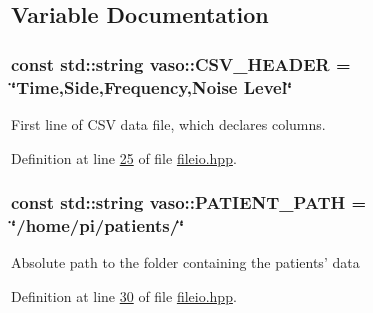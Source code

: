 \subsection{Variable Documentation}
\hypertarget{namespacevaso_ade7cbcaad3dc577b643b3eea4b4e8aa0}{
\subsubsection[{C\+S\+V\+\_\+\+H\+E\+A\+D\+E\+R}]{\setlength{\rightskip}{0pt plus 5cm}const std\+::string vaso\+::\+C\+S\+V\+\_\+\+H\+E\+A\+D\+E\+R = \char`\"{}Time,{\bf Side},Frequency,Noise Level\char`\"{}}}\label{namespacevaso_ade7cbcaad3dc577b643b3eea4b4e8aa0}
First line of C\+S\+V data file, which declares columns. 

Definition at line \hyperlink{fileio_8hpp_source_l00025}{25} of file \hyperlink{fileio_8hpp_source}{fileio.\+hpp}.

\hypertarget{namespacevaso_a0f49c8240a13e7d853912ad78d5f53c9}{
\subsubsection[{P\+A\+T\+I\+E\+N\+T\+\_\+\+P\+A\+T\+H}]{\setlength{\rightskip}{0pt plus 5cm}const std\+::string vaso\+::\+P\+A\+T\+I\+E\+N\+T\+\_\+\+P\+A\+T\+H = \char`\"{}/home/pi/patients/\char`\"{}}}\label{namespacevaso_a0f49c8240a13e7d853912ad78d5f53c9}
Absolute path to the folder containing the patients' data 

Definition at line \hyperlink{fileio_8hpp_source_l00030}{30} of file \hyperlink{fileio_8hpp_source}{fileio.\+hpp}.

